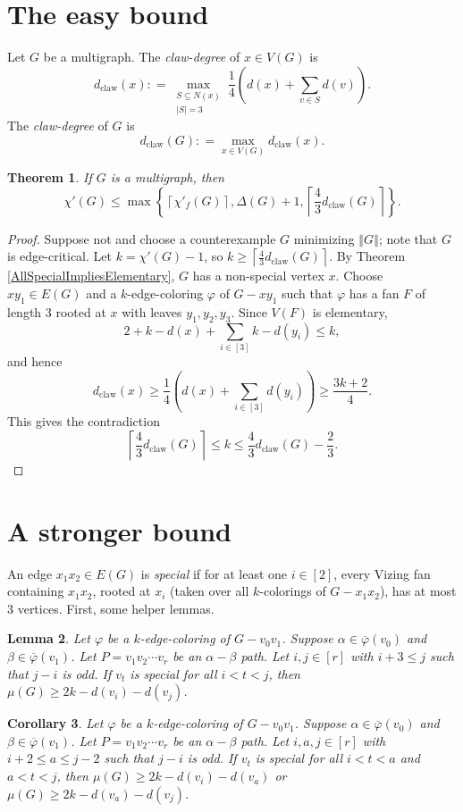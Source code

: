 \documentclass[12pt]{amsart}
\theoremstyle{plain}
\newtheorem{thm}{Theorem}
\newtheorem{lem}[thm]{Lemma}
\newtheorem{cor}[thm]{Corollary}
\theoremstyle{definition}
\theoremstyle{remark}
\newcommand{\set}[1]{\left\{ #1 \right\}}
\newcommand{\card}[1]{\left|#1\right|}
\newcommand{\size}[1]{\left\Vert#1\right\Vert}
\newcommand{\ceil}[1]{\left\lceil#1\right\rceil}
\newcommand{\irange}[1]{\left[#1\right]}
\newcommand{\parens}[1]{\left( #1 \right)}
\newcommand{\DefinedAs}{\mathrel{\mathop:}=}
\newcommand{\dclaw}[1]{d_{\text{claw}}\left( #1 \right)}
\newcommand{\vph}{\varphi}
\newcommand{\vphn}{\overline{\varphi}}
\begin{document}
\section{The easy bound}
Let $G$ be a multigraph.  The \emph{claw-degree} of $x \in V(G)$ is 
\[\dclaw{x} \DefinedAs \max_{\substack{S \subseteq N(x) \\ \card{S} = 3}}\frac14 \parens{d(x) + \sum_{v \in S} d(v)}.\]
The \emph{claw-degree} of $G$ is 
\[\dclaw{G} \DefinedAs \max_{x \in V(G)} \dclaw{x}.\]
\begin{thm}\label{EasyBound}
If $G$ is a multigraph, then
\[\chi'(G) \le \max\set{\ceil{\chi'_f(G)}, \Delta(G) + 1, \ceil{\frac43\dclaw{G}}}.\]
\end{thm}
\begin{proof}
Suppose not and choose a counterexample $G$ minimizing $\size{G}$; note that $G$ is
edge-critical. Let $k=\chi'(G)-1$, so $k \ge \ceil{\frac43\dclaw{G}}$. 
By Theorem \ref{AllSpecialImpliesElementary}, $G$ has a non-special vertex $x$.
Choose $xy_1 \in E(G)$ and a $k$-edge-coloring $\vph$ of $G - xy_1$ such that
$\vph$ has a fan $F$ of length $3$ rooted at $x$ with leaves $y_1, y_2, y_3$.  
Since $V(F)$ is elementary, 
\[2 + k - d(x) + \sum_{i \in \irange{3}} k-d(y_i) \le k,\]
and hence
\[\dclaw{x} \ge \frac14\parens{d(x) + \sum_{i \in \irange{3}} d(y_i)} \ge \frac{3k+2}{4}.\]
This gives the contradiction
\[\ceil{\frac43\dclaw{G}} \le k \le \frac43\dclaw{G} - \frac23.\]
\end{proof}

\section{A stronger bound}
An edge $x_1x_2 \in E(G)$ is \emph{special} if for at least one $i \in \irange{2}$, every Vizing fan containing $x_1x_2$, rooted at $x_i$ (taken over all $k$-colorings of $G-x_1x_2$), has at most 3 vertices.
 First, some helper lemmas.

\begin{lem}\label{HelperOne}
Let $\vph$ be a $k$-edge-coloring of $G-v_0v_1$.  Suppose $\alpha \in \vphn(v_0)$ and $\beta \in \vphn(v_1)$.  
Let $P = v_1v_2\cdots v_r$ be an $\alpha-\beta$ path.  Let $i,j \in \irange{r}$ with $i + 3 \le j$ such that $j-i$ is odd.  If $v_t$ is special for all $i < t < j$, then
$\mu(G) \ge 2k - d(v_i) - d(v_j)$.
\end{lem}

\begin{cor}\label{HelperTwo}
Let $\vph$ be a $k$-edge-coloring of $G-v_0v_1$.  Suppose $\alpha \in \vphn(v_0)$ and $\beta \in \vphn(v_1)$.  
Let $P = v_1v_2\cdots v_r$ be an $\alpha-\beta$ path.  Let $i,a,j \in \irange{r}$ with $i + 2 \le a \le j - 2$ such that $j-i$ is odd.  If $v_t$ is special for all $i < t < a$ and $a < t < j$, then
$\mu(G) \ge 2k - d(v_i) - d(v_a)$ or $\mu(G) \ge 2k - d(v_a) - d(v_j)$.
\end{cor}
\end{document}
